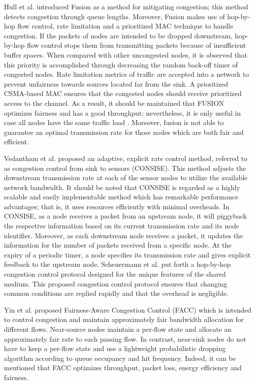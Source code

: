 Hull et al. \cite{Hull:2004:MCW:1031495.1031512} introduced Fusion as a method for mitigating congestion; this method detects congestion through queue lengths. Moreover, Fusion makes use of hop-by-hop flow control, rate limitation and a prioritized MAC technique to handle congestion. If the packets of nodes are intended to be dropped downstream, hop-by-hop flow control stops them from transmitting packets because of insufficient buffer spaces. When compared with other uncongested nodes, it is observed that this priority is accomplished through decreasing the random back-off timer of congested nodes. Rate limitation metrics of traffic are accepted into a network to prevent unfairness towards sources located far from the sink. A prioritized CSMA-based MAC ensures that the congested nodes should receive prioritized access to the channel. As a result, it should be maintained that FUSION optimizes fairness and has a good throughput; nevertheless, it is only useful in case all nodes have the same traffic load \cite{8115774}. Moreover, fusion is not able to guarantee an optimal transmission rate for those nodes which are both fair and efficient.

Vedantham et al. \cite{1495018} proposed an adaptive, explicit rate control method, referred to as congestion control from sink to sensors (CONSISE). This method adjusts the downstream transmission rate at each of the sensor nodes to utilize the available network bandwidth. It should be noted that CONSISE is regarded as a highly scalable and easily implementable method which has remarkable performance advantages; that is, it uses resources efficiently with minimal overheads. In CONSISE, as
a node receives a packet from an upstream node, it will piggyback the respective information based on its current transmission rate and its node identifier. Moreover, as each downstream node receives a packet, it updates the information for the number of packets received from a specific node. At the expiry of a periodic timer, a node specifies its transmission rate and gives
explicit feedback to the upstream node. Scheuermann et al. \cite{Scheuermann:2008:IHC:1314716.1314991} put forth a hop-by-hop congestion control protocol designed for the unique features of the shared medium. This proposed congestion control protocol ensures that changing common conditions are replied rapidly and that the overhead is negligible. 

Yin et al. \cite{5164958} proposed Fairness-Aware Congestion Control (FACC) which is intended to control congestion and maintain approximately fair bandwidth allocation for different flows. Near-source nodes maintain a per-flow state and allocate an approximately fair rate to each passing flow. In contrast, near-sink nodes do not have to keep a per-flow state and use a lightweight probabilistic dropping algorithm according to queue occupancy and hit frequency. Indeed, it can be mentioned that FACC optimizes throughput, packet loss, energy efficiency and fairness. 

